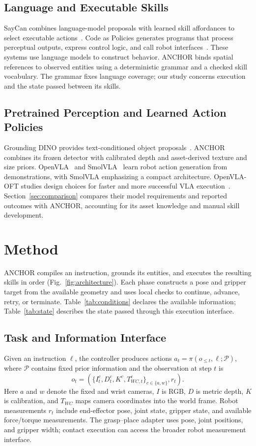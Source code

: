 \documentclass[letterpaper,10pt,conference]{ieeeconf}
\newcommand{\method}{ANCHOR}
\begin{document}
\subsection{Language and Executable Skills}
SayCan combines language-model proposals with learned skill affordances to
select executable actions~\cite{saycan}. Code as Policies generates programs
that process perceptual outputs, express control logic, and call robot
interfaces~\cite{codepolicies}. These systems use language models to construct
behavior. \method{} binds spatial references to observed entities using a
deterministic grammar and a checked skill vocabulary. The grammar fixes
language coverage; our study concerns execution and the state passed between
its skills.

\subsection{Pretrained Perception and Learned Action Policies}
Grounding DINO provides text-conditioned object proposals~\cite{groundingdino}.
\method{} combines its frozen detector with calibrated depth and asset-derived
texture and size priors. OpenVLA~\cite{openvla} and SmolVLA~\cite{smolvla}
learn robot action generation from demonstrations, with SmolVLA
emphasizing a compact architecture. OpenVLA-OFT studies design choices for
faster and more successful VLA execution~\cite{openvlaoft}.
Section~\ref{sec:comparison} compares their model requirements and reported
outcomes with \method{}, accounting for its asset knowledge and manual
skill development.

\section{Method}
\label{sec:method}
\method{} compiles an instruction, grounds its entities, and executes the
resulting skills in order (Fig.~\ref{fig:architecture}). Each phase constructs
a pose and gripper target from the available geometry and uses local
checks to continue, advance, retry, or terminate. Table~\ref{tab:conditions}
declares the available information; Table~\ref{tab:state} describes the
state passed through this execution interface.

\subsection{Task and Information Interface}
Given an instruction $\ell$, the controller produces actions
$a_t=\pi(o_{\leq t},\ell;\mathcal{P})$, where $\mathcal{P}$ contains fixed
prior information and the observation at step $t$ is
\begin{equation}
 o_t=\left(\{I_t^c,D_t^c,K^c,T_{WC,t}^c\}_{c\in\{a,w\}},r_t\right).
\end{equation}
Here $a$ and $w$ denote the fixed and wrist cameras, $I$ is RGB,
$D$ is metric depth, $K$ is calibration, and $T_{WC}$ maps camera
coordinates into the world frame. Robot measurements $r_t$ include
end-effector pose, joint state, gripper state, and available force/torque
measurements. The grasp--place adapter uses pose, joint positions, and gripper
width; contact execution can access the broader robot measurement interface.
\end{document}
